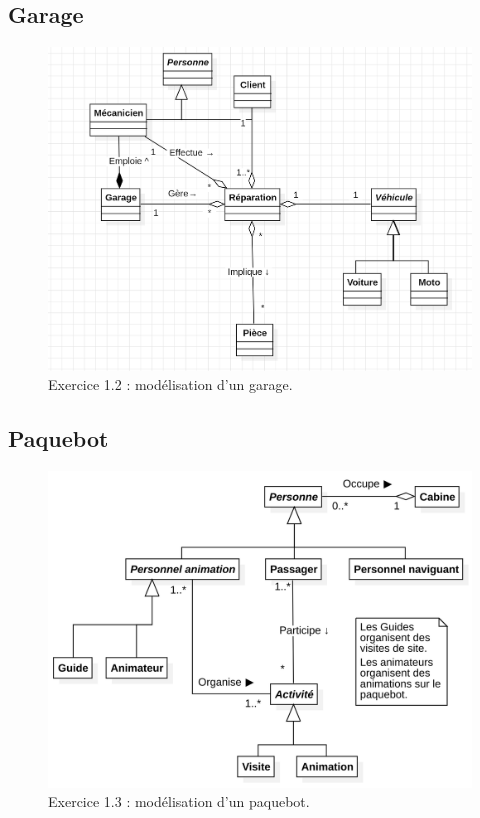 \documentclass{article}
\begin{document}
\subsection{Garage}
\begin{figure}[!htb]
    \centering
    \includegraphics[width=0.5\textheight]{./images/1-3_garage.png}
    \caption{Exercice 1.2 : modélisation d'un garage.}
\end{figure}

\subsection{Paquebot}
\begin{figure}[!htb]
    \centering
    \includegraphics[width=0.5\textheight]{./images/1-4_bateau.png}
    \caption{Exercice 1.3 : modélisation d'un paquebot.}
\end{figure}
\end{document}
